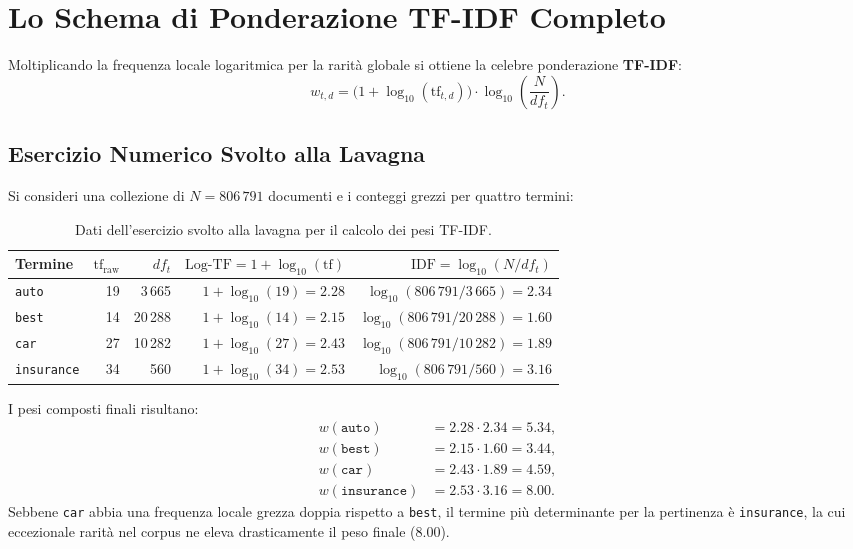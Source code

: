 \FloatBarrier
\section{Lo Schema di Ponderazione TF-IDF Completo}
\label{sec:schema-tfidf}

Moltiplicando la frequenza locale logaritmica per la rarit\`a globale si ottiene la celebre ponderazione \textbf{TF-IDF}:
\begin{equation}
w_{t, d} = \big(1 + \log_{10}(\text{tf}_{t, d})\big) \cdot \log_{10}\left(\frac{N}{df_t}\right).
\label{eq:tfidf-complete}
\end{equation}

\FloatBarrier
\subsection{Esercizio Numerico Svolto alla Lavagna}
\label{subsec:esercizio-lavagna-tfidf}

Si consideri una collezione di $N = 806\,791$ documenti e i conteggi grezzi per quattro termini:

\begin{table}[H]
\centering
\small
\begin{tabular}{l r r r r}
\toprule
\textbf{Termine} & $\text{tf}_{\text{raw}}$ & $df_t$ & $\text{Log-TF} = 1 + \log_{10}(\text{tf})$ & $\text{IDF} = \log_{10}(N / df_t)$ \\
\midrule
\texttt{auto}      & 19 & 3\,665  & $1 + \log_{10}(19) = \mathbf{2.28}$ & $\log_{10}(806\,791 / 3\,665) = \mathbf{2.34}$ \\
\texttt{best}      & 14 & 20\,288 & $1 + \log_{10}(14) = \mathbf{2.15}$ & $\log_{10}(806\,791 / 20\,288) = \mathbf{1.60}$ \\
\texttt{car}       & 27 & 10\,282 & $1 + \log_{10}(27) = \mathbf{2.43}$ & $\log_{10}(806\,791 / 10\,282) = \mathbf{1.89}$ \\
\texttt{insurance} & 34 & 560     & $1 + \log_{10}(34) = \mathbf{2.53}$ & $\log_{10}(806\,791 / 560) = \mathbf{3.16}$ \\
\bottomrule
\end{tabular}
\caption{Dati dell'esercizio svolto alla lavagna per il calcolo dei pesi TF-IDF.}
\label{tab:board-exercise-data}
\end{table}

I pesi composti finali risultano:
\begin{align}
w(\texttt{auto})      &= 2.28 \cdot 2.34 = \mathbf{5.34}, \\
w(\texttt{best})      &= 2.15 \cdot 1.60 = \mathbf{3.44}, \\
w(\texttt{car})       &= 2.43 \cdot 1.89 = \mathbf{4.59}, \\
w(\texttt{insurance}) &= 2.53 \cdot 3.16 = \mathbf{8.00}.
\end{align}
Sebbene \texttt{car} abbia una frequenza locale grezza doppia rispetto a \texttt{best}, il termine pi\`u determinante per la pertinenza \`e \texttt{insurance}, la cui eccezionale rarit\`a nel corpus ne eleva drasticamente il peso finale ($8.00$).

